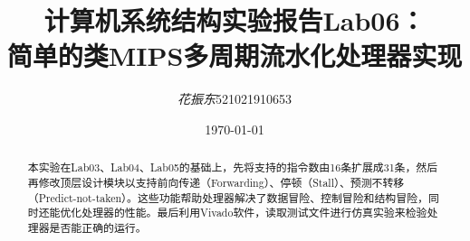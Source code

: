 \documentclass[12pt,a4paper]{ctexart}
\title{\textbf{计算机系统结构实验报告Lab06： \\ 简单的类MIPS多周期流水化处理器实现}} %
\author{
\begin{tabular}{ll}
  \textit{花振东} & 521021910653 \\
\end{tabular}
}
\date{\today} %
\begin{document}
\maketitle %

\begin{abstract}
本实验在Lab03、Lab04、Lab05的基础上，先将支持的指令数由16条扩展成31条，然后再修改顶层设计模块以支持前向传递（Forwarding）、停顿（Stall）、预测不转移（Predict-not-taken）。这些功能帮助处理器解决了数据冒险、控制冒险和结构冒险，同时还能优化处理器的性能。最后利用Vivado软件，读取测试文件进行仿真实验来检验处理器是否能正确的运行。
\end{abstract}

\tableofcontents


\pagebreak


%
%

\pagebreak


%
%
\end{document}
